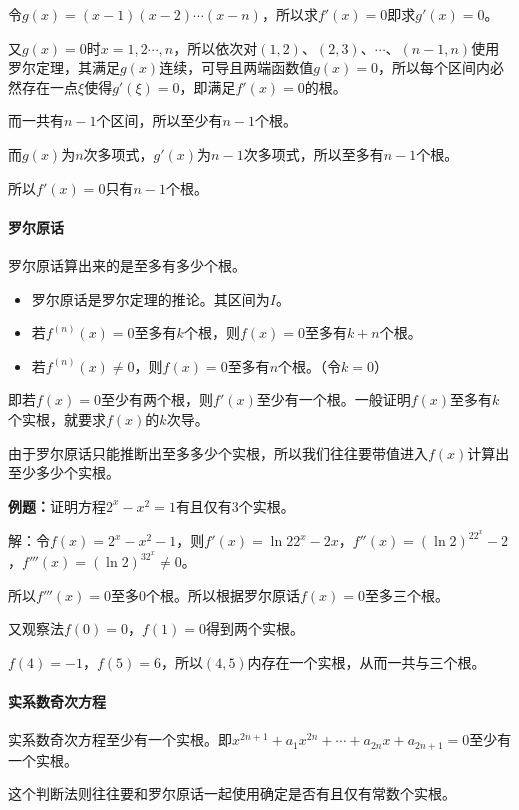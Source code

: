 \documentclass[UTF8, 12pt]{ctexart}
\begin{document}
令$g(x)=(x-1)(x-2)\cdots(x-n)$，所以求$f'(x)=0$即求$g'(x)=0$。

又$g(x)=0$时$x=1,2\cdots,n$，所以依次对$(1,2)$、$(2,3)$、$\cdots$、$(n-1,n)$使用罗尔定理，其满足$g(x)$连续，可导且两端函数值$g(x)=0$，所以每个区间内必然存在一点$\xi$使得$g'(\xi)=0$，即满足$f'(x)=0$的根。

而一共有$n-1$个区间，所以至少有$n-1$个根。

而$g(x)$为$n$次多项式，$g'(x)$为$n-1$次多项式，所以至多有$n-1$个根。

所以$f'(x)=0$只有$n-1$个根。

\paragraph{罗尔原话} \leavevmode \medskip

罗尔原话算出来的是至多有多少个根。

\begin{itemize}
    \item 罗尔原话是罗尔定理的推论。其区间为$I$。
    \item 若$f^{(n)}(x)=0$至多有$k$个根，则$f(x)=0$至多有$k+n$个根。
    \item 若$f^{(n)}(x)\neq0$，则$f(x)=0$至多有$n$个根。（令$k=0$）
\end{itemize}

即若$f(x)=0$至少有两个根，则$f'(x)$至少有一个根。一般证明$f(x)$至多有$k$个实根，就要求$f(x)$的$k$次导。

由于罗尔原话只能推断出至多多少个实根，所以我们往往要带值进入$f(x)$计算出至少多少个实根。

\textbf{例题：}证明方程$2^x-x^2=1$有且仅有3个实根。

解：令$f(x)=2^x-x^2-1$，则$f'(x)=\ln22^x-2x$，$f''(x)=(\ln2)^22^x-2$，$f'''(x)=(\ln2)^32^x\neq 0$。

所以$f'''(x)=0$至多0个根。所以根据罗尔原话$f(x)=0$至多三个根。

又观察法$f(0)=0$，$f(1)=0$得到两个实根。

$f(4)=-1$，$f(5)=6$，所以$(4,5)$内存在一个实根，从而一共与三个根。

\paragraph{实系数奇次方程} \leavevmode \medskip

实系数奇次方程至少有一个实根。即$x^{2n+1}+a_1x^{2n}+\cdots+a_{2n}x+a_{2n+1}=0$至少有一个实根。

这个判断法则往往要和罗尔原话一起使用确定是否有且仅有常数个实根。
\end{document}
